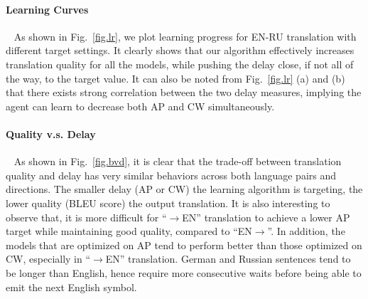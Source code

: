 \paragraph{Learning Curves}~ As shown in Fig.~\ref{fig.lr}, we plot learning progress for EN-RU translation with different target settings. It clearly shows that our algorithm effectively increases translation quality for all the models, while pushing the delay close, if not all of the way, to the target value.
It can also be noted from Fig.~\ref{fig.lr} (a) and (b) that there exists strong correlation between the two delay measures, implying the agent can learn to decrease both AP and CW simultaneously.

\paragraph{Quality v.s. Delay}~ As shown in Fig.~\ref{fig.bvd}, it is clear that the trade-off between translation quality and delay has very similar behaviors across both language pairs and directions. The smaller delay (AP or CW) the learning algorithm is targeting, the lower quality (BLEU score) the output translation. It is also interesting to observe that, it is more difficult for ``$\rightarrow$EN'' translation to achieve a lower AP target while maintaining good quality, compared to ``EN$\rightarrow$''. 
In addition, the models that are optimized on AP tend to perform better than those optimized on CW, especially in ``$\rightarrow$EN'' translation. German and Russian sentences tend to be longer than English, hence require more consecutive waits before being able to emit the next English symbol.


